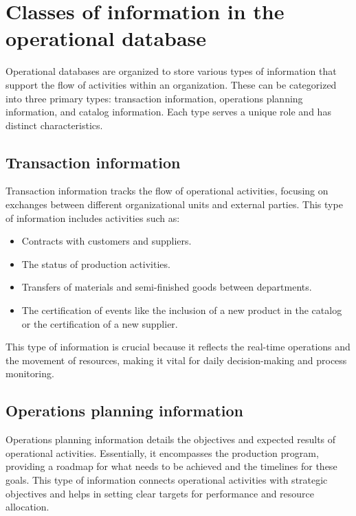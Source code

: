 \section{Classes of information in the operational database}
Operational databases are organized to store various types of information that support the flow of activities within an organization. 
These can be categorized into three primary types: transaction information, operations planning information, and catalog information. 
Each type serves a unique role and has distinct characteristics.

\subsection{Transaction information}
Transaction information tracks the flow of operational activities, focusing on exchanges between different organizational units and external parties. This type of information includes activities such as:
\begin{itemize}
    \item Contracts with customers and suppliers.
    \item The status of production activities.
    \item Transfers of materials and semi-finished goods between departments.
    \item The certification of events like the inclusion of a new product in the catalog or the certification of a new supplier.
\end{itemize}
\noindent This type of information is crucial because it reflects the real-time operations and the movement of resources, making it vital for daily decision-making and process monitoring.

\subsection{Operations planning information}
Operations planning information details the objectives and expected results of operational activities. 
Essentially, it encompasses the production program, providing a roadmap for what needs to be achieved and the timelines for these goals. 
This type of information connects operational activities with strategic objectives and helps in setting clear targets for performance and resource allocation.

